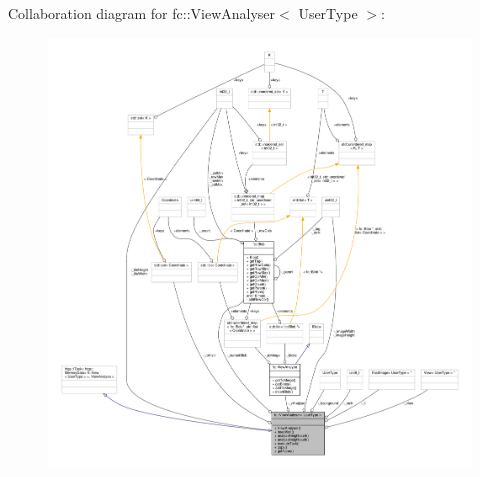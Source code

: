 Collaboration diagram for fc\+:\+:View\+Analyser$<$ User\+Type $>$\+:
\nopagebreak
\begin{figure}[H]
\begin{center}
\leavevmode
\includegraphics[width=350pt]{d0/d14/classfc_1_1ViewAnalyser__coll__graph}
\end{center}
\end{figure}
